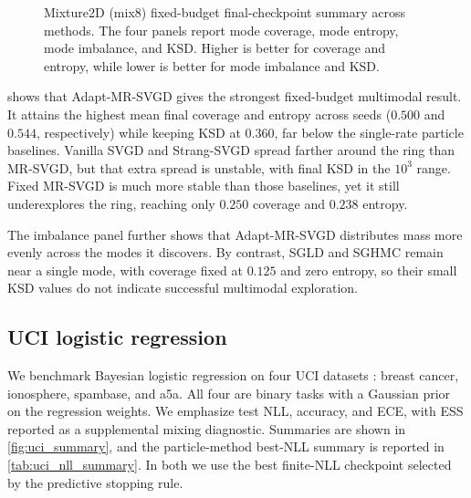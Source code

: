\begin{figure}[t]
  \centering
  \caption{Mixture2D (mix8) fixed-budget final-checkpoint summary across methods.
  The four panels report mode coverage, mode entropy, mode imbalance, and KSD.
  Higher is better for coverage and entropy, while lower is better for mode
  imbalance and KSD.}
  \label{fig:mix8_summary}
\end{figure}

 shows that Adapt-MR-SVGD gives the strongest
fixed-budget multimodal result. It attains the highest mean final coverage and
entropy across seeds ($0.500$ and $0.544$, respectively) while keeping KSD at
$0.360$, far below the single-rate particle baselines. Vanilla SVGD and
Strang-SVGD spread farther around the ring than MR-SVGD, but that extra spread
is unstable, with final KSD in the $10^3$ range. Fixed MR-SVGD is much more
stable than those baselines, yet it still underexplores the ring, reaching only
$0.250$ coverage and $0.238$ entropy.

The imbalance panel further shows that Adapt-MR-SVGD distributes mass more
evenly across the modes it discovers. By contrast, SGLD and SGHMC remain near a
single mode, with coverage fixed at $0.125$ and zero entropy, so their small
KSD values do not indicate successful multimodal exploration.

\subsection{UCI logistic regression}

We benchmark Bayesian logistic regression on four UCI datasets
\cite{dua2019uci}: breast cancer, ionosphere, spambase, and a5a. All four are
binary tasks with a Gaussian prior on the regression weights. We emphasize test NLL, accuracy, and ECE, with ESS reported as a
supplemental mixing diagnostic. Summaries are shown in
\cref{fig:uci_summary}, and the particle-method best-NLL summary is reported in
\cref{tab:uci_nll_summary}.  In both we use the best finite-NLL checkpoint selected by
the predictive stopping rule.

